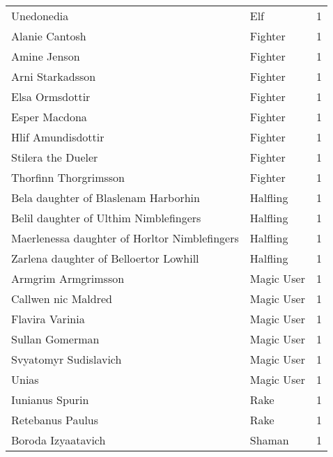 \begin{tcolorbox}[breakable, title=Index by class]
\begin{supertabular}{p{0.6\columnwidth}lr}
Unedonedia                                         & Elf             &     1\\
Alanie Cantosh                                     & Fighter         &     1\\
Amine Jenson                                       & Fighter         &     1\\
Arni Starkadsson                                   & Fighter         &     1\\
Elsa Ormsdottir                                    & Fighter         &     1\\
Esper Macdona                                      & Fighter         &     1\\
Hlif Amundisdottir                                 & Fighter         &     1\\
Stilera the Dueler                                 & Fighter         &     1\\
Thorfinn Thorgrimsson                              & Fighter         &     1\\
Bela daughter of Blaslenam Harborhin               & Halfling        &     1\\
Belil daughter of Ulthim Nimblefingers             & Halfling        &     1\\
Maerlenessa daughter of Horltor Nimblefingers      & Halfling        &     1\\
Zarlena daughter of Belloertor Lowhill             & Halfling        &     1\\
Armgrim Armgrimsson                                & Magic User      &     1\\
Callwen nic Maldred                                & Magic User      &     1\\
Flavira Varinia                                    & Magic User      &     1\\
Sullan Gomerman                                    & Magic User      &     1\\
Svyatomyr Sudislavich                              & Magic User      &     1\\
Unias                                              & Magic User      &     1\\
Iunianus Spurin                                    & Rake            &     1\\
Retebanus Paulus                                   & Rake            &     1\\
Boroda Izyaatavich                                 & Shaman          &     1\\

\end{supertabular}
\end{tcolorbox}
